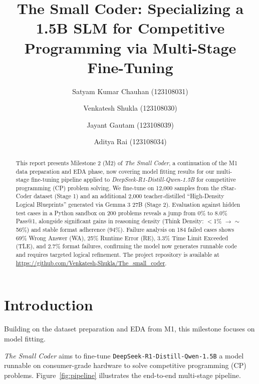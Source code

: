 \documentclass[preprint,12pt]{elsarticle}
\begin{document}
\begin{frontmatter}

    \title{The Small Coder: Specializing a 1.5B SLM for Competitive Programming via Multi-Stage Fine-Tuning}

    \author[inst1]{Satyam Kumar Chauhan (123108031)}
    \author[inst1]{Venkatesh Shukla (123108030)}
    \author[inst1]{Jayant Gautam (123108039)}
    \author[inst1]{Aditya Rai (123108034)}

    \address[inst1]{NIT Kurukshetra, Computer Science and Engineering}

    \begin{abstract}
        This report presents Milestone 2 (M2) of \textit{The Small Coder}, a continuation of the M1 data preparation and EDA phase, now covering model fitting results for our multi-stage fine-tuning pipeline applied to
        \textit{DeepSeek-R1-Distill-Qwen-1.5B} for competitive programming (CP) problem solving. We fine-tune on 12,000 samples from the rStar-Coder dataset (Stage 1) and an additional 2,000 teacher-distilled ``High-Density Logical Blueprints'' generated via Gemma 3 27B (Stage 2). Evaluation against hidden test cases in a Python sandbox on 200 problems reveals a jump from 0\% to 8.0\% Pass@1, alongside significant gains in reasoning density (Think Density: $<$1\% $\rightarrow$ $\sim$56\%) and stable format adherence (94\%). Failure analysis on 184 failed cases shows 69\% Wrong Answer (WA), 25\% Runtime Error (RE), 3.3\% Time Limit Exceeded (TLE), and 2.7\% format failures, confirming the model now generates runnable code and requires targeted logical refinement. The project repository is available at \url{https://github.com/Venkatesh-Shukla/The_small_coder}.
    \end{abstract}
\end{frontmatter}


\section{Introduction}
\label{sec:intro}

Building on the dataset preparation and EDA from M1, this milestone focuses on model fitting.

\textit{The Small Coder} aims to fine-tune \texttt{DeepSeek-R1-Distill-Qwen-1.5B} a model runnable on consumer-grade hardware to solve competitive programming (CP) problems. Figure~\ref{fig:pipeline} illustrates the end-to-end multi-stage pipeline.
\end{document}
